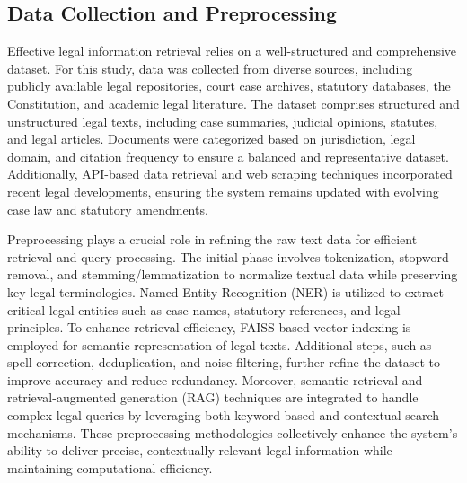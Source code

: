 \subsection{Data Collection and Preprocessing}



 
Effective legal information retrieval relies on a well-structured and comprehensive dataset. For this study, data was collected from diverse sources, including publicly available legal repositories, court case archives, statutory databases, the Constitution, and academic legal literature. The dataset comprises structured and unstructured legal texts, including case summaries, judicial opinions, statutes, and legal articles. Documents were categorized based on jurisdiction, legal domain, and citation frequency to ensure a balanced and representative dataset. Additionally, API-based data retrieval and web scraping techniques incorporated recent legal developments, ensuring the system remains updated with evolving case law and statutory amendments.  

Preprocessing plays a crucial role in refining the raw text data for efficient retrieval and query processing. The initial phase involves tokenization, stopword removal, and stemming/lemmatization to normalize textual data while preserving key legal terminologies. Named Entity Recognition (NER) is utilized to extract critical legal entities such as case names, statutory references, and legal principles. To enhance retrieval efficiency, FAISS-based vector indexing is employed for semantic representation of legal texts. Additional steps, such as spell correction, deduplication, and noise filtering, further refine the dataset to improve accuracy and reduce redundancy. Moreover, semantic retrieval and retrieval-augmented generation (RAG) techniques are integrated to handle complex legal queries by leveraging both keyword-based and contextual search mechanisms. These preprocessing methodologies collectively enhance the system’s ability to deliver precise, contextually relevant legal information while maintaining computational efficiency.

